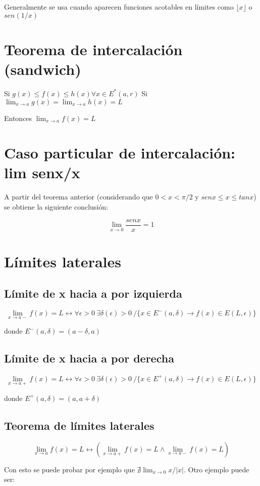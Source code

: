 \documentclass{report}
\begin{document}
		Generalmente se usa cuando aparecen funciones acotables en límites como $\lfloor x \rfloor$ o $sen(1/x)$
		
	\section{Teorema de intercalación (sandwich)}
		Si $g(x) \leq f(x) \leq h(x) \forall x \in E^{*}(a,r)$
		Si $\lim_{x \to a}g(x)=\lim_{x \to a}h(x)=L$
		
		Entonces $\lim_{x \to a}f(x)=L$
		
	\section{Caso particular de intercalación: lim senx/x}
		A partir del teorema anterior (considerando que $0<x<\pi/2$ y $senx \leq x \leq tanx$) se obtiene la siguiente conclusión:
		
		$$\lim_{x \to 0}\frac{senx}{x}=1$$
		
	\section{Límites laterales}
		\subsection{Límite de x hacia a por izquierda}
		$$\lim_{x \to a-}f(x)=L \leftrightarrow \forall \epsilon > 0 \ \exists \delta(\epsilon)>0 \ / \{x \in E^-(a,\delta) \rightarrow f(x) \in E(L,\epsilon)\}$$
		
		donde $E^-(a,\delta) = (a-\delta,a)$
		
		\subsection{Límite de x hacia a por derecha}
		$$\lim_{x \to a+}f(x)=L \leftrightarrow \forall \epsilon > 0 \ \exists \delta(\epsilon)>0 \ / \{x \in E^+(a,\delta) \rightarrow f(x) \in E(L,\epsilon)\}$$
		
		donde $E^+(a,\delta) = (a,a+\delta)$
		
		\subsection{Teorema de límites laterales}
		$$\lim_{x \to a}f(x)=L \longleftrightarrow (\lim_{x \to a+}f(x)=L \wedge \lim_{x \to a-}f(x)=L)$$
		
		Con esto se puede probar por ejemplo que $\nexists \lim_{x \to 0}x/|x|$. Otro ejemplo puede ser:
		
\end{document}
